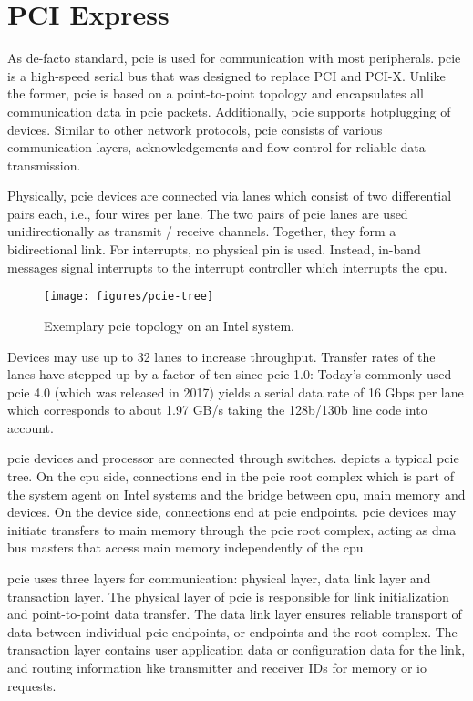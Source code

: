 \section{PCI Express}
\label{sec:pcie}

As de-facto standard, \acf{pcie} is used for communication with most
peripherals. \ac{pcie} is a high-speed serial bus that was designed to replace
PCI and PCI-X. Unlike the former, \ac{pcie} is based on a point-to-point
topology and encapsulates all communication data in \ac{pcie} packets.
Additionally, \ac{pcie} supports hotplugging of devices. Similar to other
network protocols, \ac{pcie} consists of various communication layers,
acknowledgements and flow control for reliable data transmission.

Physically, \ac{pcie} devices are connected via lanes which consist of two
differential pairs each, i.e., four wires per lane. The two pairs of \ac{pcie}
lanes are used unidirectionally as transmit / receive channels. Together, they
form a bidirectional link. For interrupts, no physical pin is used. Instead,
in-band messages signal interrupts to the interrupt controller which interrupts
the \ac{cpu}.

\begin{figure}[!b]
    \centering
    \texttt{[image: figures/pcie-tree]}
    \caption{Exemplary \acs{pcie} topology on an Intel system.}
    \label{fig:pcie-topology}
\end{figure}

Devices may use up to 32 lanes to increase throughput. Transfer rates of the
lanes have stepped up by a factor of ten since \ac{pcie} 1.0: Today's commonly
used \ac{pcie} 4.0 (which was released in 2017) yields a serial data rate of 16
Gbps per lane which corresponds to about 1.97 GB/s taking the 128b/130b line
code into account.

\ac{pcie} devices and processor are connected through switches.
 depicts a typical \ac{pcie} tree. On the \ac{cpu} side,
connections end in the \ac{pcie} root complex which is part of the system agent
on Intel systems and the bridge between \ac{cpu}, main memory and devices. On
the device side, connections end at \ac{pcie} endpoints. \ac{pcie} devices may
initiate transfers to main memory through the \ac{pcie} root complex, acting as
\acs{dma} bus masters that access main memory independently of the \ac{cpu}.

\ac{pcie} uses three layers for communication: physical layer, data link layer
and transaction layer. The physical layer of \ac{pcie} is responsible for link
initialization and point-to-point data transfer. The data link layer ensures
reliable transport of data between individual \ac{pcie} endpoints, or endpoints
and the root complex. The transaction layer contains user application data or
configuration data for the link, and routing information like transmitter and
receiver IDs for memory or \ac{io} requests.

